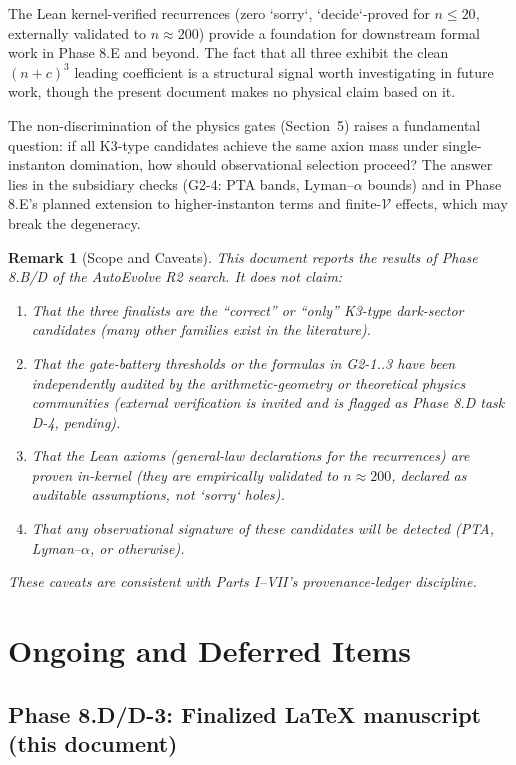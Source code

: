 \documentclass[aps,prd,twocolumn,nofootinbib,superscriptaddress,10pt]{revtex4-2}
\newtheorem{remark}{Remark}
\begin{document}
The Lean kernel-verified recurrences (zero `sorry`, `decide`-proved for $n \le 20$, externally validated to $n \approx 200$) provide a foundation for downstream formal work in Phase 8.E and beyond. The fact that all three exhibit the clean $(n + c)^3$ leading coefficient is a structural signal worth investigating in future work, though the present document makes no physical claim based on it.

The non-discrimination of the physics gates (Section~5) raises a fundamental question: if all K3-type candidates achieve the same axion mass under single-instanton domination, how should observational selection proceed? The answer lies in the subsidiary checks (G2-4: PTA bands, Lyman--$\alpha$ bounds) and in Phase 8.E's planned extension to higher-instanton terms and finite-$\mathcal{V}$ effects, which may break the degeneracy.

\begin{remark}[Scope and Caveats]
This document reports the results of Phase 8.B/D of the AutoEvolve R2 search. It does not claim:
\begin{enumerate}
    \item That the three finalists are the ``correct'' or ``only'' K3-type dark-sector candidates (many other families exist in the literature).
    \item That the gate-battery thresholds or the formulas in G2-1..3 have been independently audited by the arithmetic-geometry or theoretical physics communities (external verification is invited and is flagged as Phase 8.D task D-4, pending).
    \item That the Lean axioms (general-law declarations for the recurrences) are proven in-kernel (they are empirically validated to $n \approx 200$, declared as auditable assumptions, not `sorry` holes).
    \item That any observational signature of these candidates will be detected (PTA, Lyman--$\alpha$, or otherwise).
\end{enumerate}
These caveats are consistent with Parts I--VII's provenance-ledger discipline.
\end{remark}

\section{Ongoing and Deferred Items}

\subsection{Phase 8.D/D-3: Finalized LaTeX manuscript (this document)}
\end{document}
